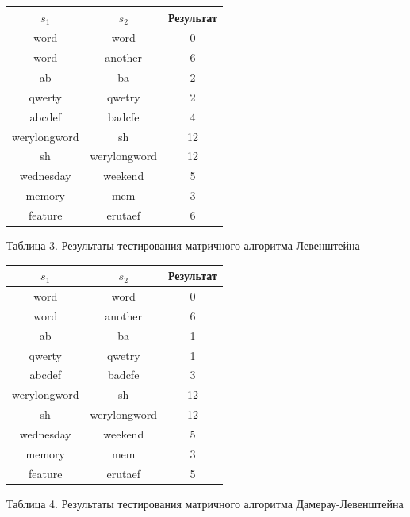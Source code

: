 \documentclass[a4paper,12pt]{article}
\begin{document}
\begin{center}
    \begin{tabular}{|c|c|c|}
        \hline
        $s_1$ & $s_2$ & Результат \\
        \hline
        word & word & 0 \\
        \hline
        word & another & 6 \\
        \hline
        ab & ba & 2 \\
        \hline
        qwerty & qwetry & 2 \\
        \hline
        abcdef & badcfe & 4 \\
        \hline
        werylongword & sh & 12 \\
        \hline
        sh & werylongword & 12 \\
        \hline
        wednesday & weekend & 5 \\
        \hline
        memory & mem & 3 \\
        \hline
        feature & erutaef & 6 \\
        \hline
    \end{tabular}

    Таблица 3. Результаты тестирования матричного алгоритма Левенштейна
\end{center}

\hfill

\begin{center}
    \begin{tabular}{|c|c|c|}
        \hline
        $s_1$ & $s_2$ & Результат \\
        \hline
        word & word & 0 \\
        \hline
        word & another & 6 \\
        \hline
        ab & ba & 1 \\
        \hline
        qwerty & qwetry & 1 \\
        \hline
        abcdef & badcfe & 3 \\
        \hline
        werylongword & sh & 12 \\
        \hline
        sh & werylongword & 12 \\
        \hline
        wednesday & weekend & 5 \\
        \hline
        memory & mem & 3 \\
        \hline
        feature & erutaef & 5 \\
        \hline
    \end{tabular}

    Таблица 4. Результаты тестирования матричного алгоритма Дамерау-Левенштейна
\end{center}
\end{document}
